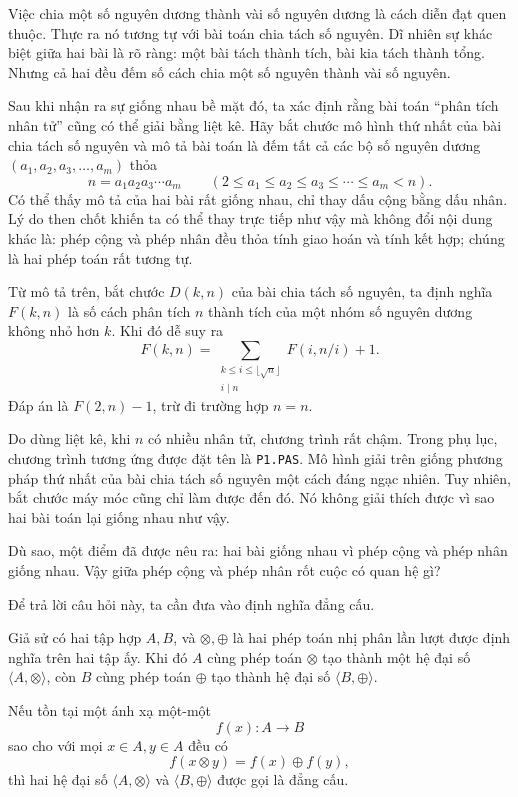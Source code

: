 \documentclass[11pt]{article}
\begin{document}
Việc chia một số nguyên dương thành vài số nguyên dương là cách diễn đạt quen
thuộc. Thực ra nó tương tự với bài toán chia tách số nguyên. Dĩ nhiên sự khác
biệt giữa hai bài là rõ ràng: một bài tách thành tích, bài kia tách thành
tổng. Nhưng cả hai đều đếm số cách chia một số nguyên thành vài số nguyên.

Sau khi nhận ra sự giống nhau bề mặt đó, ta xác định rằng bài toán ``phân tích
nhân tử'' cũng có thể giải bằng liệt kê. Hãy bắt chước mô hình thứ nhất của
bài chia tách số nguyên và mô tả bài toán là đếm tất cả các bộ số nguyên dương
\((a_1,a_2,a_3,\ldots,a_m)\) thỏa
\[
  n=a_1a_2a_3\cdots a_m
  \qquad (2\le a_1\le a_2\le a_3\le\cdots\le a_m<n).
\]
Có thể thấy mô tả của hai bài rất giống nhau, chỉ thay dấu cộng bằng dấu
nhân. Lý do then chốt khiến ta có thể thay trực tiếp như vậy mà không đổi nội
dung khác là: phép cộng và phép nhân đều thỏa tính giao hoán và tính kết hợp;
chúng là hai phép toán rất tương tự.

Từ mô tả trên, bắt chước \(D(k,n)\) của bài chia tách số nguyên, ta định nghĩa
\(F(k,n)\) là số cách phân tích \(n\) thành tích của một nhóm số nguyên dương
không nhỏ hơn \(k\). Khi đó dễ suy ra
\[
  F(k,n)=
  \sum_{\substack{k\le i\le \lfloor\sqrt n\rfloor\\ i\mid n}}
  F(i,n/i)+1.
\]
Đáp án là \(F(2,n)-1\), trừ đi trường hợp \(n=n\).

Do dùng liệt kê, khi \(n\) có nhiều nhân tử, chương trình rất chậm. Trong phụ
lục, chương trình tương ứng được đặt tên là \texttt{P1.PAS}. Mô hình giải
trên giống phương pháp thứ nhất của bài chia tách số nguyên một cách đáng
ngạc nhiên. Tuy nhiên, bắt chước máy móc cũng chỉ làm được đến đó. Nó không
giải thích được vì sao hai bài toán lại giống nhau như vậy.

Dù sao, một điểm đã được nêu ra: hai bài giống nhau vì phép cộng và phép nhân
giống nhau. Vậy giữa phép cộng và phép nhân rốt cuộc có quan hệ gì?

Để trả lời câu hỏi này, ta cần đưa vào định nghĩa đẳng cấu.

Giả sử có hai tập hợp \(A,B\), và \(\otimes,\oplus\) là hai phép toán nhị phân
lần lượt được định nghĩa trên hai tập ấy. Khi đó \(A\) cùng phép toán
\(\otimes\) tạo thành một hệ đại số \(\langle A,\otimes\rangle\), còn \(B\)
cùng phép toán \(\oplus\) tạo thành hệ đại số \(\langle B,\oplus\rangle\).

Nếu tồn tại một ánh xạ một-một
\[
  f(x):A\to B
\]
sao cho với mọi \(x\in A, y\in A\) đều có
\[
  f(x\otimes y)=f(x)\oplus f(y),
\]
thì hai hệ đại số \(\langle A,\otimes\rangle\) và
\(\langle B,\oplus\rangle\) được gọi là đẳng cấu.
\end{document}
